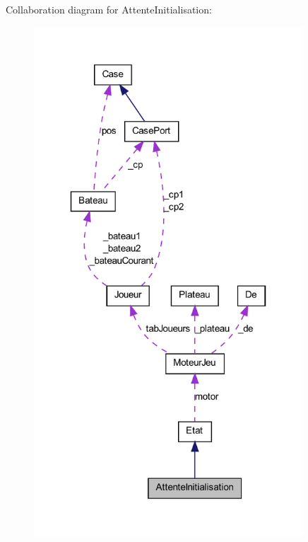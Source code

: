 Collaboration diagram for AttenteInitialisation:
\nopagebreak
\begin{figure}[H]
\begin{center}
\leavevmode
\includegraphics[width=285pt]{class_attente_initialisation__coll__graph}
\end{center}
\end{figure}
